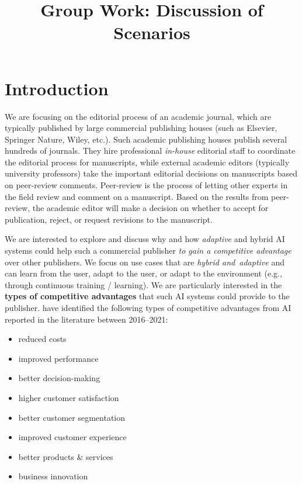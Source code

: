 \documentclass{article}
\title{Group Work: Discussion of Scenarios}
\begin{document}
\maketitle

\section{Introduction}

We are focusing on the editorial process of an academic journal, which are typically published by large commercial publishing houses
(such as Elsevier, Springer Nature, Wiley, etc.). Such academic publishing houses publish several hundreds of journals. They hire
professional \textit{in-house} editorial staff to coordinate the editorial process for manuscripts, while external academic
editors (typically university professors) take the important editorial decisions on manuscripts based on peer-review comments.
Peer-review is the process of letting other experts in the field review and comment on a manuscript. Based on the results from
peer-review, the academic editor will make a decision on whether to accept for publication, reject, or request revisions to the manuscript. 

We are interested to explore and discuss why and how \textit{adaptive} and hybrid AI systems could help such a commercial publisher
\textit{to gain a competitive advantage} over other publishers. We focus on use cases that are \textit{hybrid and adaptive} and can
learn from the user, adapt to the user, or adapt to the environment (e.g., through continuous training / learning). We are particularly
interested in the \textbf{types of competitive advantages} that such AI systems could provide to the publisher.
\cite{hoArtificialIntelligenceFirm2022} have identified the following types of competitive advantages from AI reported in the
literature between 2016--2021:

\begin{itemize}
    \item reduced costs
    \item improved performance
    \item better decision-making
    \item higher customer satisfaction
    \item better customer segmentation
    \item improved customer experience
    \item better products \& services
    \item business innovation
\end{itemize}
\end{document}
